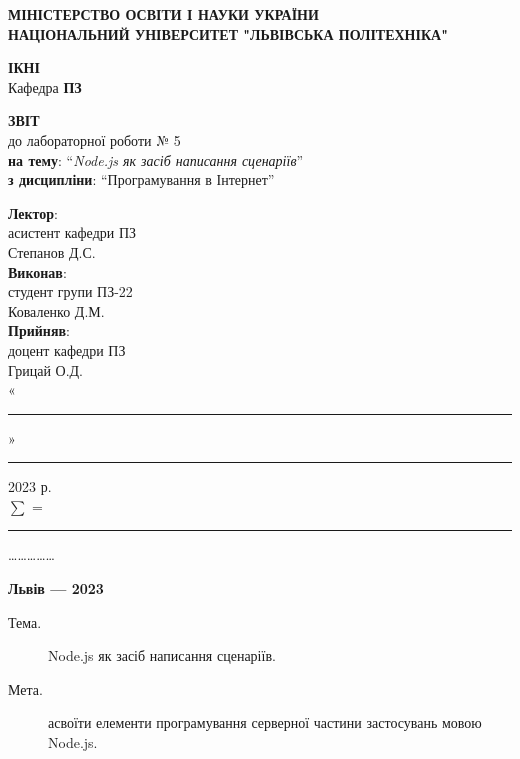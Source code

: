 \documentclass{article}
\newcommand\subject{Програмування в Інтернет}
\newcommand\lecturer{асистент кафедри ПЗ \\ Степанов Д.С.}
\newcommand\teacher{доцент кафедри ПЗ \\ Грицай О.Д.}
\newcommand\mygroup{ПЗ-22}
\newcommand\lab{5}
\newcommand\theme{Node.js як засіб написання сценаріїв}
\newcommand\purpose{асвоїти елементи програмування серверної частини застосувань мовою
	Node.js}
\begin{document}
\begin{normalsize}
\begin{titlepage}
	\thispagestyle{empty}
	\begin{center}
		\textbf{МІНІСТЕРСТВО ОСВІТИ І НАУКИ УКРАЇНИ\\
			НАЦІОНАЛЬНИЙ УНІВЕРСИТЕТ "ЛЬВІВСЬКА ПОЛІТЕХНІКА"}
	\end{center}
	\begin{flushright}
		\textbf{ІКНІ}\\
		Кафедра \textbf{ПЗ}
	\end{flushright}
	\vspace{200pt}
	\begin{center}
		\textbf{ЗВІТ}\\
		\vspace{10pt}
		до лабораторної роботи № \lab\\
		\textbf{на тему}: “\textit{\theme}”\\
		\textbf{з дисципліни}: “\subject”
	\end{center}
	\vspace{112pt}
	\begin{flushright}
		
		\textbf{Лектор}:\\
		\lecturer\\
		\vspace{28pt}
		\textbf{Виконав}:\\
		
		студент групи \mygroup\\
		Коваленко Д.М.\\
		\vspace{28pt}
		\textbf{Прийняв}:\\
		
		\teacher\\
		
		\vspace{28pt}
		«\rule{1cm}{0.15mm}» \rule{1.5cm}{0.15mm} 2023 р.\\
		$\sum$ = \rule{1cm}{0.15mm}……………\\
		
	\end{flushright}
	\vspace{\fill}
	\begin{center}
		\textbf{Львів — 2023}
	\end{center}
\end{titlepage}
	
\begin{description}
	\item[Тема.] \theme.
	\item[Мета.] \purpose.
\end{description}


\end{normalsize}
\end{document}

